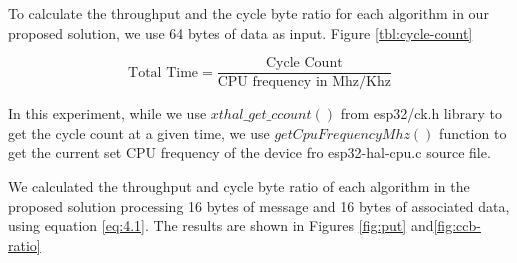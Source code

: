 To calculate the throughput and the cycle byte ratio for each algorithm in our proposed solution, we use 64 bytes of data as input. Figure \ref{tbl:cycle-count}

\begin{equation}
\text{Total Time} = \frac{\text{Cycle Count}}{\text{CPU frequency in Mhz/Khz}}
\label{eq:4.2}
\end{equation}

In this experiment, while we use \texttt{$xthal\_get\_ccount()$} from esp32/ck.h library to get the cycle count at a given time, we use \texttt{$getCpuFrequencyMhz()$} function to get the current set CPU frequency of the device fro esp32-hal-cpu.c source file.  

We calculated the throughput and cycle byte ratio of each algorithm in the proposed solution processing 16 bytes of message and 16 bytes of associated data, using equation \ref{eq:4.1}. The results are shown in Figures \ref{fig:put} and\ref{fig:ccb-ratio}


